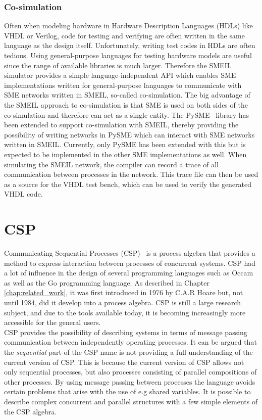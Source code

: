 \subsubsection{Co-simulation}
Often when modeling hardware in Hardware Description Languages (HDLs) like VHDL or Verilog, code for testing and verifying are often written in the same language as the design itself. Unfortunately, writing test codes in HDLs are often tedious. Using general-purpose languages for testing hardware models are useful since the range of available libraries is much larger.
Therefore the SMEIL simulator provides a simple language-independent API which enables SME implementations written for general-purpose languages to communicate with SME networks written in SMEIL, so-called co-simulation.
The big advantage of the SMEIL approach to co-simulation is that SME is used on both sides of the co-simulation and therefore can act as a single entity.
The PySME~\cite{pysme} library has been extended to support co-simulation with SMEIL, thereby providing the possibility of writing networks in PySME which can interact with SME networks written in SMEIL. Currently, only PySME has been extended with this but is expected to be implemented in the other SME implementations as well.
When simulating the SMEIL network, the compiler can record a trace of all communication between processes in the network. This trace file can then be used as a source for the VHDL test bench, which can be used to verify the generated VHDL code.
\section{CSP}
\label{sec:csp_background}
Communicating Sequential Processes (CSP)~\cite{Hoare1978} is a process algebra that provides a method to express interaction between processes of concurrent systems.
CSP had a lot of influence in the design of several programming languages such as Occam as well as the Go programming language.
As described in Chapter \ref{chap:related_work}, it was first introduced in 1976 by C.A.R Hoare but, not until 1984, did it develop into a process algebra. CSP is still a large research subject, and due to the tools available today, it is becoming increasingly more accessible for the general users.\\

CSP provides the possibility of describing systems in terms of message passing communication between independently operating processes. It can be argued that the \textit{sequential} part of the CSP name is not providing a full understanding of the current version of CSP. This is because the current version of CSP allows not only sequential processes, but also processes consisting of parallel compositions of other processes.
By using message passing between processes the language avoids certain problems that arise with the use of e.g shared variables.
It is possible to describe complex concurrent and parallel structures with a few simple elements of the CSP algebra.\\


